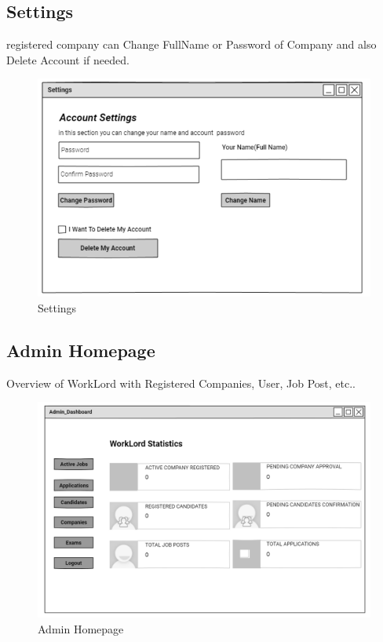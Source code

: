 \documentclass[a4paper,12pt]{report}
\begin{document}
\subsection {Settings}
 registered company can Change FullName or Password of Company and also Delete Account if needed.
\begin{figure}[bph]
	\centering
	\includegraphics[width=.6\linewidth]{img/company/changecmpnypassword}
	\caption{Settings}
\end{figure}
\pagebreak
{}
\subsection {Admin Homepage}
Overview of WorkLord with Registered Companies, User, Job Post, etc.. 
\begin{figure}[bph]
	\centering
	\includegraphics[width=1\linewidth]{img/admin/admindash}
	\caption{Admin Homepage}
\end{figure}


\pagebreak
\end{document}
